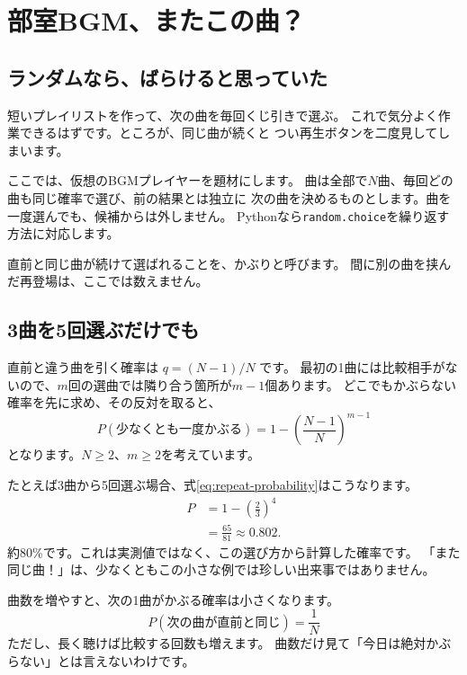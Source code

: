 \chapter{部室BGM、またこの曲？}
\label{chap:algorithm}
\chapterauthor{\AuthorTwo}

\section{ランダムなら、ばらけると思っていた}
短いプレイリストを作って、次の曲を毎回くじ引きで選ぶ。
これで気分よく作業できるはずです。ところが、同じ曲が続くと
つい再生ボタンを二度見してしまいます。

ここでは、仮想のBGMプレイヤーを題材にします。
曲は全部で$N$曲、毎回どの曲も同じ確率で選び、前の結果とは独立に
次の曲を決めるものとします。曲を一度選んでも、候補からは外しません。
Pythonなら\texttt{random.choice}を繰り返す方法に対応します\cite{python:random}。

\begin{definition}
  直前と同じ曲が続けて選ばれることを、かぶりと呼びます。
  間に別の曲を挟んだ再登場は、ここでは数えません。
\end{definition}

\section{3曲を5回選ぶだけでも}
直前と違う曲を引く確率は $q=(N-1)/N$ です。
最初の1曲には比較相手がないので、$m$回の選曲では隣り合う箇所が$m-1$個あります。
どこでもかぶらない確率を先に求め、その反対を取ると、
\begin{equation}
  P(\text{少なくとも一度かぶる})
    =1-\left(\frac{N-1}{N}\right)^{m-1}
  \label{eq:repeat-probability}
\end{equation}
となります。$N\geq2$、$m\geq2$を考えています。

たとえば3曲から5回選ぶ場合、式\eqref{eq:repeat-probability}はこうなります。
\begin{align}
  P &= 1-\left(\frac{2}{3}\right)^4 \\
    &= \frac{65}{81}\approx 0.802.
\end{align}
約80\%です。これは実測値ではなく、この選び方から計算した確率です。
「また同じ曲！」は、少なくともこの小さな例では珍しい出来事ではありません。

曲数を増やすと、次の1曲がかぶる確率は小さくなります。
\[
  P(\text{次の曲が直前と同じ})=\frac{1}{N}
\]
ただし、長く聴けば比較する回数も増えます。
曲数だけ見て「今日は絶対かぶらない」とは言えないわけです。

